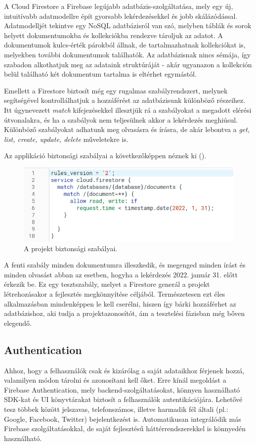 A Cloud Firestore a Firebase legújabb adatbázis-szolgáltatása, mely egy új, intuitívabb adatmodellre épít gyorsabb lekérdezésekkel és jobb skálázódással. \cite{RealtimevsFirestore} Adatmodelljét tekintve egy NoSQL adatbázisról van szó, melyben táblák és sorok helyett dokumentumokba és kollekciókba rendezve tároljuk az adatot. A dokumentumok kulcs-érték párokból állnak, de tartalmazhatnak kollekciókat is, melyekben további dokumentumok találhatók. \cite{FirestoreDataModel} Az adatbázisnak nincs sémája, így szabadon alkothatjuk meg az adataink struktúráját - akár ugyanazon a kollekción belül található két dokumentum tartalma is eltérhet egymástól.

Emellett a Firestore biztosít még egy rugalmas szabályrendszert, melynek segítségével kontrollálhatjuk a hozzáférést az adatbázisunk különböző részeihez. Itt úgynevezett \emph{match} kifejezésekkel illesztjük rá a szabályokat a megadott elérési útvonalakra, és ha a szabályok nem teljesülnek akkor a lekérdezés meghiúsul. Különböző szabályokat adhatunk meg olvasásra és írásra, de akár lebontva a \emph{get, list, create, update, delete} műveletekre is.

Az applikáció biztonsági szabályai a következőképpen néznek ki ().

\begin{figure}[!ht]
	\centering
	\includegraphics[width=120mm, keepaspectratio]{figures/rules.png}
	\caption{A projekt biztonsági szabályai.}
	\label{fig:FirestoreRules}
\end{figure}

A fenti szabály minden dokumentumra illeszkedik, és megenged minden írást és minden olvasást abban az esetben, hogyha a lekérdezés 2022. január 31. előtt érkezik be. Ez egy tesztszabály, melyet a Firestore generál a projekt létrehozásakor a fejlesztés megkönnyítése céljából. Természetesen ezt éles alkalmazásban mindenképpen le kell cserélni, hiszen így bárki hozzáférhet az adatbázishoz, aki tudja a projektazonosítót, ám a tesztelési fázisban még bőven elegendő.

\subsection{Authentication}
Ahhoz, hogy a felhasználók csak és kizárólag a saját adataikhoz férjenek hozzá, valamilyen módon tárolni és azonosítani kell őket. Erre kínál megoldást a Firebase Authentication, mely backend-szolgáltatásokat, könnyen használható SDK-kat és UI könyvtárakat biztosít a felhasználók autentikációjára. Lehetővé tesz többek között jelszavas, telefonszámos, illetve harmadik fél általi (pl.: Google, Facebook, Twitter) bejelentkezést is. Automatikusan integrálódik más Firebase szolgáltatásokkal, de saját fejlesztésű háttérrendszerekkel is könnyedén használható. \cite{Auth}


